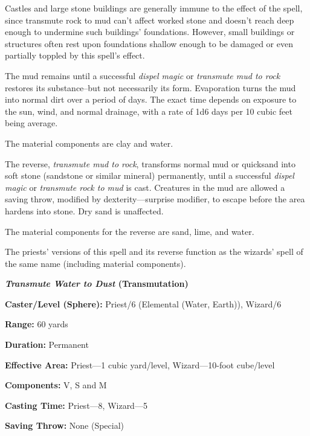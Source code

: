 \begin{multicols}{2}
Castles and large stone buildings are generally immune to the effect of the spell, since transmute rock to mud can't affect worked stone and doesn't reach deep enough to undermine such buildings' foundations.  However, small buildings or structures often rest upon foundations shallow enough to be damaged or even partially toppled by this spell's effect. 

The mud remains until a successful \textit{dispel magic} or \textit{transmute mud to rock} restores its substance--but not necessarily its form. Evaporation turns the mud into normal dirt over a period of days. The exact time depends on exposure to the sun, wind, and normal drainage, with a rate of 1d6 days per 10 cubic feet being average.

The material components are clay and water.

The reverse, \textit{transmute mud to rock}, transforms normal mud or quicksand into soft stone (sandstone or similar mineral) permanently, until a successful \textit{dispel magic} or \textit{transmute rock to mud} is cast.  Creatures in the mud are allowed a saving throw, modified by dexterity---surprise modifier, to escape before the area hardens into stone. Dry sand is unaffected.

The material components for the reverse are sand, lime, and water.

The priests' versions of this spell and its reverse function as the wizards' spell of the same name (including material components).

\vspace{1em}

\noindent
\begin{minipage}{\columnwidth}

\noindent \textbf{\textit{Transmute Water to Dust} (Transmutation)}

\noindent \textbf{Caster/Level (Sphere):} Priest/6 (Elemental (Water, Earth)), Wizard/6

\noindent \textbf{Range:} 60 yards

\noindent \textbf{Duration:} Permanent

\noindent \textbf{Effective Area:} Priest---1 cubic yard/level, Wizard---10-foot cube/level

\noindent \textbf{Components:} V, S and M

\noindent \textbf{Casting Time:} Priest---8, Wizard---5

\noindent \textbf{Saving Throw:} None (Special)

\end{minipage}


\end{multicols}
